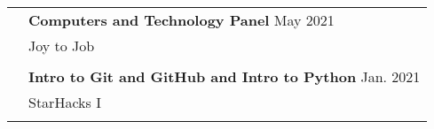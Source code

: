 \documentclass[letterpaper, 11pt]{article}
\begin{document}
\begin{longtable}{p{1.3in}p{4.8in}}
	 & \textbf{Computers and Technology Panel} \hfill May 2021                                                                                                                                                \\
	 & Joy to Job                                                                                                                                                                                             \\
	 &                                                                                                                                                                                                        \\

	 & \textbf{Intro to Git and GitHub and Intro to Python} \hfill Jan. 2021                                                                                                                                  \\
	 & StarHacks I                                                                                                                                                                                            \\
	 &                                                                                                                                                                                                        \\



\end{longtable}
\end{document}
